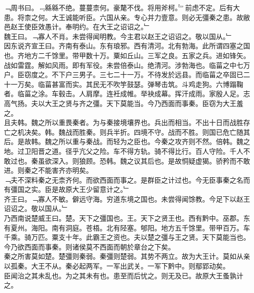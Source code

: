\documentclass{zhvt-classic}
\begin{document}
\hspace*{2em}﹁周书曰。﹃緜緜不绝。蔓蔓柰何。豪氂不伐。将用斧柯。﹄前虑不定。后有大患。将柰之何。大王诚能听臣。六国从亲。专心并力壹意。则必无彊秦之患。故敝邑赵王使臣效愚计。奉明约。在大王之诏诏之。﹂\\
\hspace*{2em}魏王曰。﹁寡人不肖。未尝得闻明教。今主君以赵王之诏诏之。敬以国从。﹂\\
\hspace*{2em}因东说齐宣王曰。齐南有泰山。东有琅邪。西有清河。北有勃海。此所谓四塞之国也。齐地方二千馀里。带甲数十万。粟如丘山。三军之良。五家之兵。进如锋矢。战如雷霆。解如风雨。即有军役。未尝倍泰山。绝清河。涉勃海也。临菑之中七万户。臣窃度之。不下户三男子。三七二十一万。不待发於远县。而临菑之卒固已二十一万矣。临菑甚富而实。其民无不吹竽鼓瑟。弹琴击筑。斗鸡走狗。六博蹋鞠者。临菑之涂。车毂击。人肩摩。连衽成帷。举袂成幕。挥汗成雨。家殷人足。志高气扬。夫以大王之贤与齐之彊。天下莫能当。今乃西面而事秦。臣窃为大王羞之。\\
\hspace*{2em}且夫韩。魏之所以重畏秦者。为与秦接境壤界也。兵出而相当。不出十日而战胜存亡之机决矣。韩。魏战而胜秦。则兵半折。四境不守。战而不胜。则国已危亡随其后。是故韩。魏之所以重与秦战。而轻为之臣也。今秦之攻齐则不然。倍韩。魏之地。过卫阳晋之道。径乎亢父之险。车不得方轨。骑不得比行。百人守险。千人不敢过也。秦虽欲深入。则狼顾。恐韩。魏之议其后也。是故恫疑虚猲。骄矜而不敢进。则秦之不能害齐亦明矣。\\
\hspace*{2em}﹁夫不深料秦之无柰齐何。而欲西面而事之。是群臣之计过也。今无臣事秦之名而有彊国之实。臣是故原大王少留意计之。﹂\\
\hspace*{2em}齐王曰。﹁寡人不敏。僻远守海。穷道东境之国也。未尝得闻馀教。今足下以赵王诏诏之。敬以国从。﹂\\
\hspace*{2em}乃西南说楚威王曰。楚。天下之彊国也。王。天下之贤王也。西有黔中。巫郡。东有夏州。海阳。南有洞庭。苍梧。北有陉塞。郇阳。地方五千馀里。带甲百万。车千乘。骑万匹。粟支十年。此霸王之资也。夫以楚之彊与王之贤。天下莫能当也。今乃欲西面而事秦。则诸侯莫不西面而朝於章台之下矣。\\
\hspace*{2em}秦之所害莫如楚。楚彊则秦弱。秦彊则楚弱。其势不两立。故为大王计。莫如从亲以孤秦。大王不从。秦必起两军。一军出武关。一军下黔中。则鄢郢动矣。\\
\hspace*{2em}臣闻治之其未乱也。为之其未有也。患至而后忧之。则无及已。故原大王蚤孰计之。\\
\end{document}
